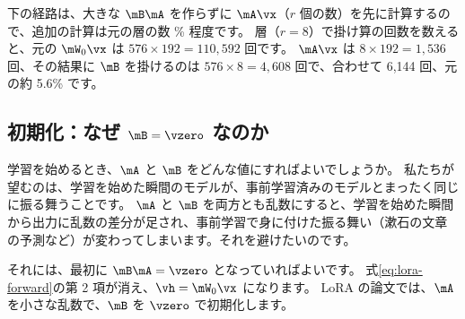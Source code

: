 下の経路は、大きな $\mB\mA$ を作らずに $\mA\vx$（$r$ 個の数）を先に計算するので、追加の計算は元の層の数 \% 程度です。
 層（$r=8$）で掛け算の回数を数えると、元の $\mW_0\vx$ は $576\times192=110{,}592$ 回です。
$\mA\vx$ は $8\times192=1{,}536$ 回、その結果に $\mB$ を掛けるのは $576\times8=4{,}608$ 回で、合わせて 6,144 回、元の約 5.6\% です。

\subsection{初期化：なぜ $\mB=\vzero$ なのか}\label{sec:lora-init}

学習を始めるとき、$\mA$ と $\mB$ をどんな値にすればよいでしょうか。
私たちが望むのは、学習を始めた瞬間のモデルが、事前学習済みのモデルとまったく同じに振る舞うことです。
$\mA$ と $\mB$ を両方とも乱数にすると、学習を始めた瞬間から出力に乱数の差分が足され、事前学習で身に付けた振る舞い（漱石の文章の予測など）が変わってしまいます。それを避けたいのです。

それには、最初に $\mB\mA=\vzero$ となっていればよいです。
式\eqref{eq:lora-forward}の第 2 項が消え、$\vh=\mW_0\vx$ になります。
LoRA の論文では、$\mA$ を小さな乱数で、$\mB$ を $\vzero$ で初期化します\cite{hu2022lora}。

